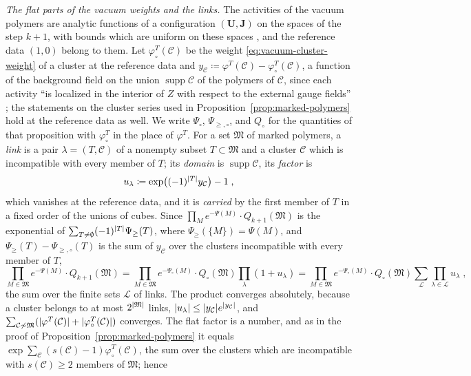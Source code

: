 \documentclass[11pt]{preprint}
\DeclarePairedDelimiter{\abs}{\lvert}{\rvert}
\numberwithin{equation}{section}
\theoremstyle{definition}
\theoremstyle{remark}
\theoremstyle{plain}
\begin{document}
\emph{The flat parts of the vacuum weights and the links.} The activities of the vacuum polymers are analytic functions of a configuration $(\mathbf U, \mathbf J)$ on the spaces of the step $k + 1$, with bounds which are uniform on these spaces \cite[pp.~6, 15]{BalabanRG2}, and the reference data $(1, 0)$ belong to them. Let $\varphi^T_\circ(\mathcal C)$ be the weight \eqref{eq:vacuum-cluster-weight} of a cluster at the reference data and $y_{\mathcal C} \coloneqq \varphi^T(\mathcal C) - \varphi^T_\circ(\mathcal C)$, a function of the background field on the union $\operatorname{supp}\mathcal C$ of the polymers of $\mathcal C$, since each activity ``is localized in the interior of $Z$ with respect to the external gauge fields'' \cite[p.~14]{BalabanRG2}; the statements on the cluster series used in Proposition~\ref{prop:marked-polymers} hold at the reference data as well. We write $\Psi_\circ$, $\Psi_{\geq,\circ}$, and $Q_\circ$ for the quantities of that proposition with $\varphi^T_\circ$ in the place of $\varphi^T$. For a set $\mathfrak M$ of marked polymers, a \emph{link} is a pair $\lambda = (T, \mathcal C)$ of a nonempty subset $T \subset \mathfrak M$ and a cluster $\mathcal C$ which is incompatible with every member of $T$; its \emph{domain} is $\operatorname{supp}\mathcal C$, its \emph{factor} is
\begin{equation}\label{eq:link-factor}
    u_\lambda \coloneqq \exp\bigl((-1)^{\abs T}y_{\mathcal C}\bigr) - 1\;,
\end{equation}
which vanishes at the reference data, and it is \emph{carried} by the first member of $T$ in a fixed order of the unions of cubes. Since $\prod_Me^{-\Psi(M)} \cdot Q_{k+1}(\mathfrak M)$ is the exponential of $\sum_{T \neq \emptyset}(-1)^{\abs T}\Psi_{\geq}(T)$, where $\Psi_{\geq}(\{ M \}) = \Psi(M)$, and $\Psi_{\geq}(T) - \Psi_{\geq,\circ}(T)$ is the sum of $y_{\mathcal C}$ over the clusters incompatible with every member of $T$,
\begin{equation}\label{eq:link-expansion}
    \prod_{M \in \mathfrak M}e^{-\Psi(M)} \cdot Q_{k+1}(\mathfrak M) = \prod_{M \in \mathfrak M}e^{-\Psi_\circ(M)} \cdot Q_\circ(\mathfrak M)\prod_\lambda(1 + u_\lambda) = \prod_{M \in \mathfrak M}e^{-\Psi_\circ(M)} \cdot Q_\circ(\mathfrak M)\sum_{\mathcal L}\prod_{\lambda \in \mathcal L}u_\lambda\;,
\end{equation}
the sum over the finite sets $\mathcal L$ of links. The product converges absolutely, because a cluster belongs to at most $2^{\abs{\mathfrak M}}$ links, $\abs{u_\lambda} \leq \abs{y_{\mathcal C}}e^{\abs{y_{\mathcal C}}}$, and $\sum_{\mathcal C \not\sim \mathfrak M}(\abs{\varphi^T(\mathcal C)} + \abs{\varphi^T_\circ(\mathcal C)})$ converges. The flat factor is a number, and as in the proof of Proposition~\ref{prop:marked-polymers} it equals $\exp\sum_{\mathcal C}(s(\mathcal C) - 1)\varphi^T_\circ(\mathcal C)$, the sum over the clusters which are incompatible with $s(\mathcal C) \geq 2$ members of $\mathfrak M$; hence
\end{document}
